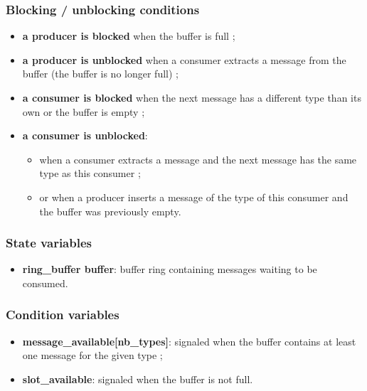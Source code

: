 \documentclass[a4paper, 12pt]{article}
\begin{document}
\subsubsection{Blocking / unblocking conditions}
\begin{itemize}
    \item \textbf{a producer is blocked} when the buffer is full ;
    \item \textbf{a producer is unblocked} when a consumer extracts a message
        from the buffer (the buffer is no longer full) ;
    \item \textbf{a consumer is blocked} when the next message has a different
        type than its own or the buffer is empty ;
    \item \textbf{a consumer is unblocked}:
        \begin{itemize}
            \item when a consumer extracts a message and the next message has
                the same type as this consumer ;
            \item or when a producer inserts a message of the type of this
                consumer and the buffer was previously empty.
        \end{itemize}
\end{itemize}

\subsubsection{State variables}
\begin{itemize}
    \item \textbf{ring\_buffer buffer}: buffer ring containing messages waiting
        to be consumed.
\end{itemize}

\subsubsection{Condition variables}
\begin{itemize}
    \item \textbf{message\_available[nb\_types]}: signaled when the buffer
        contains at least one message for the given type ;
    \item \textbf{slot\_available}: signaled when the buffer is not full.
\end{itemize}

\pagebreak
\end{document}
